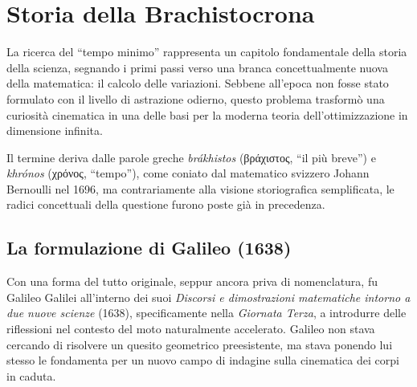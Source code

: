 \documentclass[a4paper,12pt]{article} %
\begin{document}
\section{Storia della Brachistocrona}

La ricerca del ``tempo minimo'' rappresenta un capitolo fondamentale della storia della scienza, segnando i primi passi verso una branca concettualmente nuova della matematica: il calcolo delle variazioni. Sebbene all'epoca non fosse stato formulato con il livello di astrazione odierno, questo problema trasformò una curiosità cinematica in una delle basi per la moderna teoria dell'ottimizzazione in dimensione infinita.

Il termine deriva dalle parole greche \textit{brákhistos} (\foreignlanguage{greek}{βράχιστος}, ``il più breve'') e \textit{khrónos} (\foreignlanguage{greek}{χρόνος}, ``tempo''), come coniato dal matematico svizzero Johann Bernoulli nel 1696, ma contrariamente alla visione storiografica semplificata, le radici concettuali della questione furono poste già in precedenza.

\subsection{La formulazione di Galileo (1638)}

Con una forma del tutto originale, seppur ancora priva di nomenclatura, fu Galileo Galilei all'interno dei suoi \textit{Discorsi e dimostrazioni matematiche intorno a due nuove scienze} (1638), specificamente nella \textit{Giornata Terza}, a introdurre delle riflessioni nel contesto del moto naturalmente accelerato. Galileo non stava cercando di risolvere un quesito geometrico preesistente, ma stava ponendo lui stesso le fondamenta per un nuovo campo di indagine sulla cinematica dei corpi in caduta.
\end{document}
